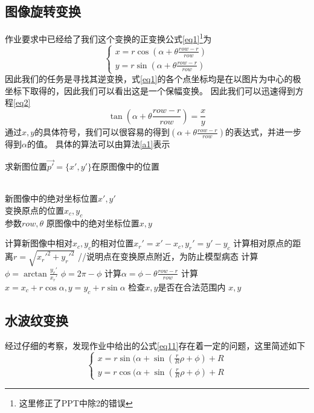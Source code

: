 \documentclass[UTF8,a4paper]{paper}\usepackage[utf8]{inputenc}\usepackage{algorithm}
\begin{document}
\subsection{图像旋转变换}
作业要求中已经给了我们这个变换的正变换公式\ref{eq1}\footnote{这里修正了PPT中除2的错误}为
\begin{equation}\begin{cases}\displaystyle{
    x = r\cos(\alpha + \theta\frac{row - r}{row})} \\ \displaystyle{
    y = r\sin(\alpha + \theta\frac{row - r}{row})
}\end{cases}\label{eq1}\end{equation}
因此我们的任务是寻找其逆变换，式\ref{eq1}的各个点坐标均是在以图片为中心的极坐标下取得的，因此我们可以看出这是一个保幅变换。
因此我们可以迅速得到方程\ref{eq2}
\begin{equation}\tan(\alpha + \theta\frac{row - r}{row}) = \frac{x}{y}\label{eq2}\end{equation}
通过$x,y$的具体符号，我们可以很容易的得到$(\alpha + \theta\frac{row - r}{row})$的表达式，并进一步得到$\alpha$的值。
具体的算法可以由算法\ref{a1}表示
\begin{algorithm}[h]\caption{求新图位置$\vec{p'} = \{x',y'\}$在原图像中的位置}\label{a1}\begin{algorithmic}
    \Require \\ 新图像中的绝对坐标位置$x',y'$\\ 变换原点的位置$x_c,y_c$\\ 参数$row,\theta$
    \Ensure 原图像中的绝对坐标位置$x,y$\end{algorithmic}\begin{algorithmic}[1]
    \State 计算新图像中相对$x_c,y_c$的相对位置$x_r' = x' - x_c, y_r' = y' - y_c$
    \State 计算相对原点的距离$r = \sqrt{x_r'^2 + y_r'^2}$
        \State //说明点在变换原点附近，为防止模型病态
        \State {}
    \EndIf
    \State 计算$\phi = \arctan\frac{y_r'}{x_r'}$
        \State $\phi = 2\pi - \phi$
    \EndIf
    \State 计算$\alpha = \phi - \theta\frac{row - r}{row}$
    \State 计算$x = x_c + r\cos\alpha, y = y_c + r\sin\alpha$
    \State 检查$x,y$是否在合法范围内
    \State \Return $x,y$
    \EndFunction
\end{algorithmic}\end{algorithm}
\subsection{水波纹变换}
经过仔细的考察，发现作业中给出的公式\ref{eq11}存在着一定的问题，这里简述如下
\begin{equation}\begin{cases}\displaystyle{
    x = r\sin(\alpha + \sin(\frac{r}{R}\rho + \phi) + R} \\ \displaystyle{
    y = r\cos(\alpha + \sin(\frac{r}{R}\rho + \phi) + R
}\end{cases}\label{eq11}\end{equation}
\end{document}
